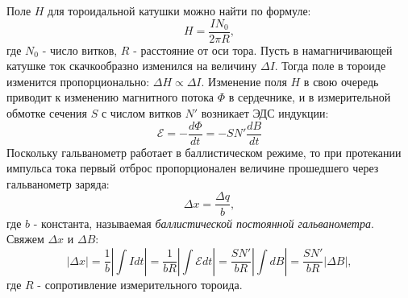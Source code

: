 \documentclass[14pt, a4paper,reqno]{article}
\begin{document}
    Поле $H$ для тороидальной катушки можно найти по формуле:
    \begin{equation}\label{H-field}
        H = \frac{IN_0}{2\pi R},
    \end{equation}
    где $N_0$ - число витков, $R$ - расстояние от оси тора. Пусть в намагничивающей катушке ток скачкообразно изменился на величину
    $\Delta I$. Тогда поле в тороиде изменится пропорционально: $\Delta H \propto \Delta I$. Изменение поля $H$ в свою очередь приводит
    к изменению магнитного потока $\Phi$ в сердечнике, и в измерительной обмотке сечения $S$ с числом витков $N'$ возникает ЭДС
    индукции:
    \begin{equation*}
        \mathcal{E} = -\frac{d\Phi}{dt} = -SN'\frac{dB}{dt}
    \end{equation*}
    Поскольку гальванометр работает в баллистическом режиме, то при протекании импульса тока первый отброс \grqq
    пропорционален величине прошедшего через гальванометр заряда:
    \begin{equation*}
        \Delta x = \frac{\Delta q}{b},
    \end{equation*}
    где $b$ - константа, называемая \textit{баллистической постоянной гальванометра}. Свяжем $\Delta x$ и $\Delta B$:
    \begin{equation}\label{delta_x}
        |\Delta x| = \frac{1}{b}\left|\int I dt\right| = \frac{1}{bR}\left|\int \mathcal{E}dt\right| = 
        \frac{SN'}{bR}\left|\int dB\right| = \frac{SN'}{bR}|\Delta B|,
    \end{equation}
    где $R$ - сопротивление измерительного тороида.
\end{document}

